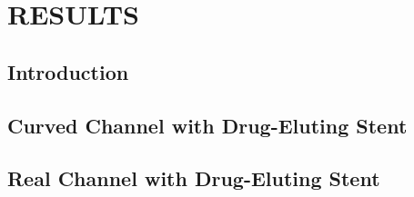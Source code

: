 \chapter{\textbf{RESULTS}}
\label{resultados}

\section{\textbf{Introduction}} 


%

\section{\textbf{Curved Channel with Drug-Eluting Stent}} 
\label{canal curvado com stent}


%

\section{\textbf{Real Channel with Drug-Eluting Stent}} 
\label{canal real com stent}


%

